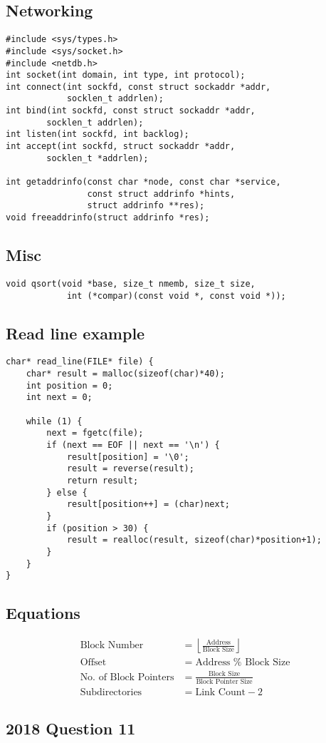 \documentclass[10pt, a4paper]{article}
\begin{document}
\begin{multicols}{4}
    \subsection*{Networking}
    \begin{lstlisting}
#include <sys/types.h>
#include <sys/socket.h>
#include <netdb.h>
int socket(int domain, int type, int protocol);
int connect(int sockfd, const struct sockaddr *addr, 
            socklen_t addrlen); 
int bind(int sockfd, const struct sockaddr *addr,  
        socklen_t addrlen);
int listen(int sockfd, int backlog);
int accept(int sockfd, struct sockaddr *addr, 
        socklen_t *addrlen);

int getaddrinfo(const char *node, const char *service, 
                const struct addrinfo *hints, 
                struct addrinfo **res);
void freeaddrinfo(struct addrinfo *res);
    \end{lstlisting}

    \subsection*{Misc}
    \begin{lstlisting}
void qsort(void *base, size_t nmemb, size_t size,
            int (*compar)(const void *, const void *));
    \end{lstlisting}

    \subsection*{Read line example}
    \begin{lstlisting}
char* read_line(FILE* file) {
    char* result = malloc(sizeof(char)*40);
    int position = 0;
    int next = 0;

    while (1) {
        next = fgetc(file);
        if (next == EOF || next == '\n') {
            result[position] = '\0';
            result = reverse(result);
            return result;
        } else {
            result[position++] = (char)next;
        }
        if (position > 30) {
            result = realloc(result, sizeof(char)*position+1);
        }
    }
}
    \end{lstlisting}

    \subsection*{Equations}
    \begin{align*}
        \text{Block Number} &= \left\lfloor \frac{\text{Address}}{\text{Block Size}}\right\rfloor \\
        \text{Offset} &= \text{Address } \% \text{ Block Size} \\
        \text{No. of Block Pointers} &= \frac{\text{Block Size}}{\text{Block Pointer Size}} \\
        \text{Subdirectories} &= \text{Link Count} -2
    \end{align*}

    \subsection*{2018 Question 11}
    

\end{multicols}
\end{document}
